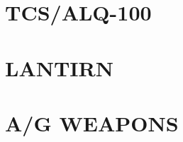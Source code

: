 \documentclass[8pt,usenames,dvipsnames,twoside]{article}
\begin{document}
		\cleardoublepage
		
		\section{TCS/ALQ-100}
		
		\cleardoublepage
		
		\section{LANTIRN}
		
		\cleardoublepage
		
		\section{A/G WEAPONS}
		
\end{document}
